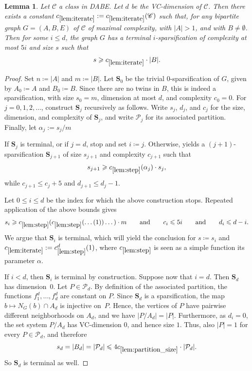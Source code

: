 \documentclass[11pt]{article}
\newtheorem{lemma}{Lemma}
\theoremstyle{definition}
\newcommand{\CC}{{\mathscr C}}
\newcommand{\inducedSS}[2]{#1/#2}%
\renewcommand{\leq}{\leqslant}
\renewcommand{\le}{\leqslant}
\renewcommand{\ge}{\geqslant}
\renewcommand{\cal}{\mathcal}
\begin{document}
\begin{lemma}\label{lem:iterate}
  Let $\CC$ a class in DABE. Let $d$ be the VC-dimension of $\CC$. Then there exists a constant $c_{\ref{lem:iterate}} := c_{\ref{lem:iterate}}(\CC)$ such that, for any bipartite graph $G=(A,B,E)$ of $\CC$ of maximal complexity, with
  $|A|>1$, and with $B\neq\emptyset$.
  Then for some $i\le d$, the graph $G$ has a terminal $i$-sparsification 
  of complexity at most $5i$ 
  and size $s$ such that
  \[
    s\ge c_{\ref{lem:iterate}} \cdot |B|.
  \]
\end{lemma}
\begin{proof}
  Set $n\coloneqq|A|$ and $m\coloneqq|B|$.
Let $\mathbf S_0$ be the trivial $0$-sparsification of $G$, given by
$A_0\coloneqq A$ and $B_0\coloneqq B$.
Since there are no twins in $B$, this is indeed a sparsification, with
size $s_0=m$, dimension at most $d$, and complexity $c_0=0$.
For $j=0,1,2,\ldots$, construct $\mathbf S_j$ recursively as follows.
Write $s_j$, $d_j$, and $c_j$ for the size, dimension, and
complexity of $\mathbf S_j$, and write $\cal P_j$ for its associated
partition. Finally, let $\alpha_j := s_j/m$

If $\mathbf S_j$ is terminal, or if $j=d$, stop and set $i\coloneqq j$.
Otherwise,  yields a $(j+1)$-sparsification
$\mathbf S_{j+1}$ of size $s_{j+1}$ and complexity $c_{j+1}$ such that
\[
  s_{j+1}
  \ge c_{\ref{lem:step}}(\alpha_j) \cdot s_j,
\]
while $c_{j+1}\le c_j+5$ and $d_{j+1}\le d_j-1$.

Let $0 \leq i \leq d$ be the index for which the above construction stops.
Repeated application of the above bounds
gives
\[
  s_i\ge c_{\ref{lem:step}}(c_{\ref{lem:step}}(\dots (1))\dots) \cdot m
  \qquad\text{and}\qquad
  c_i\le 5i\qquad\text{and}\qquad d_i\le d-i.
\]
We argue that $\mathbf S_i$ is terminal,
which will yield the conclusion for $s\coloneqq s_i$ and $c_{\ref{lem:iterate}} := c_{\ref{lem:step}}^d(1)$, where $c_{\ref{lem:step}}$ is seen as a simple function its parameter $\alpha$.

If $i<d$, then $\mathbf S_i$ is terminal by construction.
Suppose now that $i=d$.
Then $\mathbf S_d$ has dimension~$0$.
Let $P\in\cal P_d$.
By definition of the associated partition, the functions
$f^d_1,\ldots,f^d_d$ are constant on $P$.
Since $\mathbf S_d$ is a sparsification, the map
$b\mapsto N_G(b)\cap A_d$ is injective on~$P$. 
Hence, the vertices of $P$ have pairwise different neighborhoods on $A_d$, and we have $|\inducedSS{P}{A_d}| = |P|$.
Furthermore, as $d_i=0$, the set system $\inducedSS{P}{A_d}$ has VC-dimension $0$,
and hence size $1$.
Thus, also $|P|=1$ for every $P\in\cal P_d$, and therefore
\[
  s_d=|B_d|=|\cal P_d|\le 4c_{\ref{lem:partition_size}} \cdot |\cal P_d|.
\]
So $\mathbf S_d$ is terminal as well.
\end{proof}
\end{document}

